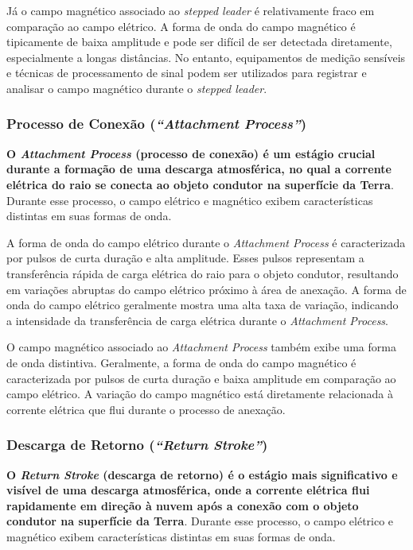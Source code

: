 \documentclass[a4paper, 12pt, onecolumn,singlespacing]{article}
\begin{document}
		Já o campo magnético associado ao \textit{stepped leader} é relativamente fraco em comparação ao campo elétrico. A forma de onda do campo magnético é tipicamente de baixa amplitude e pode ser difícil de ser detectada diretamente, especialmente a longas distâncias. No entanto, equipamentos de medição sensíveis e técnicas de processamento de sinal podem ser utilizados para registrar e analisar o campo magnético durante o \textit{stepped leader}.
		
	\subsubsection{Processo de Conexão (\textit{``Attachment Process''})}
	
		\textbf{O \textit{Attachment Process} (processo de conexão) é um estágio crucial durante a formação de uma descarga atmosférica, no qual a corrente elétrica do raio se conecta ao objeto condutor na superfície da Terra}. Durante esse processo, o campo elétrico e magnético exibem características distintas em suas formas de onda.
		
		A forma de onda do campo elétrico durante o \textit{Attachment Process} é caracterizada por pulsos de curta duração e alta amplitude. Esses pulsos representam a transferência rápida de carga elétrica do raio para o objeto condutor, resultando em variações abruptas do campo elétrico próximo à área de anexação. A forma de onda do campo elétrico geralmente mostra uma alta taxa de variação, indicando a intensidade da transferência de carga elétrica durante o \textit{Attachment Process}.
		
		O campo magnético associado ao \textit{Attachment Process} também exibe uma forma de onda distintiva. Geralmente, a forma de onda do campo magnético é caracterizada por pulsos de curta duração e baixa amplitude em comparação ao campo elétrico. A variação do campo magnético está diretamente relacionada à corrente elétrica que flui durante o processo de anexação.
	
	\subsubsection{Descarga de Retorno (\textit{``Return Stroke''})}
		\textbf{O \textit{Return Stroke} (descarga de retorno) é o estágio mais significativo e visível de uma descarga atmosférica, onde a corrente elétrica flui rapidamente em direção à nuvem após a conexão com o objeto condutor na superfície da Terra}. Durante esse processo, o campo elétrico e magnético exibem características distintas em suas formas de onda.
		
\end{document}
